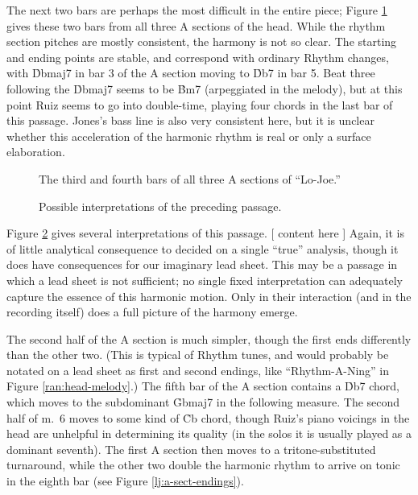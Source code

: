 The next two bars are perhaps the most difficult in the entire piece; Figure
\ref{lj:a-third-fourth} gives these two bars from all three A sections of the
head. While the rhythm section pitches are mostly consistent, the harmony is
not so clear. The starting and ending points are stable, and correspond with
ordinary Rhythm changes, with \h{Dbmaj7} in bar 3 of the A section moving to
\h{Db7} in bar 5. Beat three following the \h{Dbmaj7} seems to be \h{Bm7}
(arpeggiated in the melody), but at this point Ruiz seems to go into
double-time, playing four chords in the last bar of this passage. Jones's bass
line is also very consistent here, but it is unclear whether this acceleration
of the harmonic rhythm is real or only a surface elaboration.

\begin{figure}[tbp]
  \caption{The third and fourth bars of all three A sections of ``Lo-Joe.''}
  \label{lj:a-third-fourth}
\end{figure}

\begin{figure}[tbp]
  \caption[Possible interpretations of the third and fourth bars of the A
  sections.]{%
    Possible interpretations of the preceding passage.}
  \label{lj:third-fourth-analyses}
\end{figure}

Figure \ref{lj:third-fourth-analyses} gives several interpretations of this
passage.
[ content here ]
Again, it is of little analytical consequence to
decided on a single ``true'' analysis, though it does have consequences for
our imaginary lead sheet. This may be a passage in which a lead sheet is not
sufficient; no single fixed interpretation can adequately capture the essence
of this harmonic motion. Only in their interaction (and in the recording
itself) does a full picture of the harmony emerge.

The second half of the A section is much simpler, though the first ends
differently than the other two. (This is typical of Rhythm tunes, and would
probably be notated on a lead sheet as first and second endings, like
``Rhythm-A-Ning'' in Figure \ref{ran:head-melody}.) The fifth bar of the A
section contains a \h{Db7} chord, which moves to the subdominant \h{Gbmaj7} in
the following measure. The second half of m.~6 moves to some kind of \h{Cb}
chord, though Ruiz's piano voicings in the head are unhelpful in determining
its quality (in the solos it is usually played as a dominant seventh). The
first A section then moves to a tritone-substituted turnaround, while the
other two double the harmonic rhythm to arrive on tonic in the eighth bar
(see Figure \ref{lj:a-sect-endings}).

